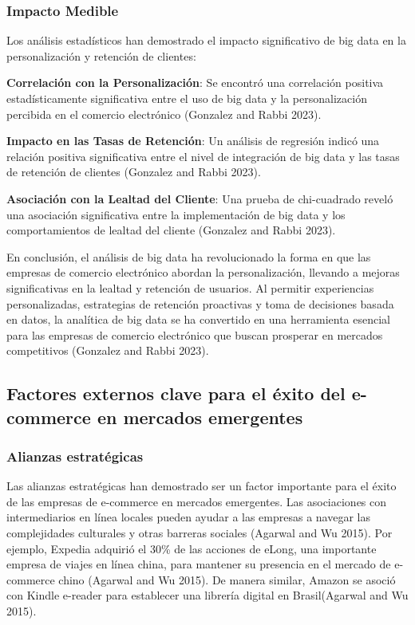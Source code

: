 \documentclass{article}
\begin{document}
\subsubsection{Impacto Medible}\label{impacto-medible}

Los análisis estadísticos han demostrado el impacto significativo de big
data en la personalización y retención de clientes:

\textbf{Correlación con la Personalización}: Se encontró una correlación
positiva estadísticamente significativa entre el uso de big data y la
personalización percibida en el comercio electrónico (Gonzalez and Rabbi
2023).

\textbf{Impacto en las Tasas de Retención}: Un análisis de regresión
indicó una relación positiva significativa entre el nivel de integración
de big data y las tasas de retención de clientes (Gonzalez and Rabbi
2023).

\textbf{Asociación con la Lealtad del Cliente}: Una prueba de
chi-cuadrado reveló una asociación significativa entre la implementación
de big data y los comportamientos de lealtad del cliente (Gonzalez and
Rabbi 2023).

En conclusión, el análisis de big data ha revolucionado la forma en que
las empresas de comercio electrónico abordan la personalización,
llevando a mejoras significativas en la lealtad y retención de usuarios.
Al permitir experiencias personalizadas, estrategias de retención
proactivas y toma de decisiones basada en datos, la analítica de big
data se ha convertido en una herramienta esencial para las empresas de
comercio electrónico que buscan prosperar en mercados competitivos
(Gonzalez and Rabbi 2023).

\subsection{Factores externos clave para el éxito del e-commerce en
mercados
emergentes}\label{factores-externos-clave-para-el-uxe9xito-del-e-commerce-en-mercados-emergentes}

\subsubsection{Alianzas estratégicas}\label{alianzas-estratuxe9gicas}

Las alianzas estratégicas han demostrado ser un factor importante para
el éxito de las empresas de e-commerce en mercados emergentes. Las
asociaciones con intermediarios en línea locales pueden ayudar a las
empresas a navegar las complejidades culturales y otras barreras
sociales (Agarwal and Wu 2015). Por ejemplo, Expedia adquirió el 30\% de
las acciones de eLong, una importante empresa de viajes en línea china,
para mantener su presencia en el mercado de e-commerce chino (Agarwal
and Wu 2015). De manera similar, Amazon se asoció con Kindle e-reader
para establecer una librería digital en Brasil(Agarwal and Wu 2015).
\end{document}
